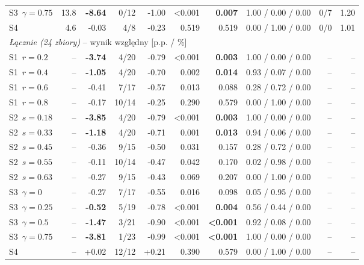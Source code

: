{\begin{longtable}{lrrrrrrcrr}
S3~$\gamma=0.75$ & 13.8 & \textbf{-8.64} & 0/12 & -1.00 & <0.001 & \textbf{0.007} & 1.00 / 0.00 / 0.00 & 0/7 & 1.20 \\
S4 & 4.6 & -0.03 & 4/8 & -0.23 & 0.519 & 0.519 & 0.00 / 1.00 / 0.00 & 0/0 & 1.01 \\
\midrule
\multicolumn{10}{l}{\emph{Łącznie (24 zbiory)} -- wynik względny [p.p. / \%]}\\
S1~$r=0.2$ & -- & \textbf{-3.74} & 4/20 & -0.79 & <0.001 & \textbf{0.003} & 1.00 / 0.00 / 0.00 & -- & -- \\
S1~$r=0.4$ & -- & \textbf{-1.05} & 4/20 & -0.70 & 0.002 & \textbf{0.014} & 0.93 / 0.07 / 0.00 & -- & -- \\
S1~$r=0.6$ & -- & -0.41 & 7/17 & -0.57 & 0.013 & 0.088 & 0.28 / 0.72 / 0.00 & -- & -- \\
S1~$r=0.8$ & -- & -0.17 & 10/14 & -0.25 & 0.290 & 0.579 & 0.00 / 1.00 / 0.00 & -- & -- \\
S2~$s=0.18$ & -- & \textbf{-3.85} & 4/20 & -0.79 & <0.001 & \textbf{0.003} & 1.00 / 0.00 / 0.00 & -- & -- \\
S2~$s=0.33$ & -- & \textbf{-1.18} & 4/20 & -0.71 & 0.001 & \textbf{0.013} & 0.94 / 0.06 / 0.00 & -- & -- \\
S2~$s=0.45$ & -- & -0.36 & 9/15 & -0.50 & 0.031 & 0.157 & 0.28 / 0.72 / 0.00 & -- & -- \\
S2~$s=0.55$ & -- & -0.11 & 10/14 & -0.47 & 0.042 & 0.170 & 0.02 / 0.98 / 0.00 & -- & -- \\
S2~$s=0.63$ & -- & -0.27 & 9/15 & -0.43 & 0.069 & 0.207 & 0.00 / 1.00 / 0.00 & -- & -- \\
S3~$\gamma=0$ & -- & -0.27 & 7/17 & -0.55 & 0.016 & 0.098 & 0.05 / 0.95 / 0.00 & -- & -- \\
S3~$\gamma=0.25$ & -- & \textbf{-0.52} & 5/19 & -0.78 & <0.001 & \textbf{0.004} & 0.56 / 0.44 / 0.00 & -- & -- \\
S3~$\gamma=0.5$ & -- & \textbf{-1.47} & 3/21 & -0.90 & <0.001 & \textbf{<0.001} & 0.92 / 0.08 / 0.00 & -- & -- \\
S3~$\gamma=0.75$ & -- & \textbf{-3.81} & 1/23 & -0.99 & <0.001 & \textbf{<0.001} & 1.00 / 0.00 / 0.00 & -- & -- \\
S4 & -- & +0.02 & 12/12 & +0.21 & 0.390 & 0.579 & 0.00 / 1.00 / 0.00 & -- & -- \\
\bottomrule
\end{longtable}
}
